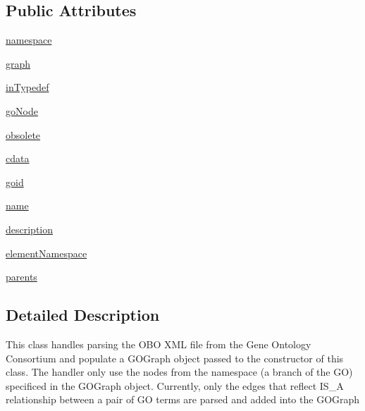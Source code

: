 \subsection*{Public Attributes}
\begin{DoxyCompactItemize}
\item 
\hyperlink{class_g_o_obo_xml_handler_1_1_g_o_obo_xml_handler_aecef11101379b72ea17282b417561bdf}{namespace}
\item 
\hyperlink{class_g_o_obo_xml_handler_1_1_g_o_obo_xml_handler_a44c8fab20dfbfe85307ab3bdc367cc99}{graph}
\item 
\hyperlink{class_g_o_obo_xml_handler_1_1_g_o_obo_xml_handler_a5c0eab36b7e0fb534bdbc22da5166b58}{inTypedef}
\item 
\hyperlink{class_g_o_obo_xml_handler_1_1_g_o_obo_xml_handler_a7c5743967a730bef12ef9ddac6834929}{goNode}
\item 
\hyperlink{class_g_o_obo_xml_handler_1_1_g_o_obo_xml_handler_aba8b9fba07d936ffc046b26fc1e10069}{obsolete}
\item 
\hyperlink{class_g_o_obo_xml_handler_1_1_g_o_obo_xml_handler_ae31e5a7b6388636e2dd341e0acc641c6}{cdata}
\item 
\hyperlink{class_g_o_obo_xml_handler_1_1_g_o_obo_xml_handler_ae3b360ff34e08ef35aee28e88bce8d88}{goid}
\item 
\hyperlink{class_g_o_obo_xml_handler_1_1_g_o_obo_xml_handler_a7fc8050192b7fd5dd66ec525b9cbe962}{name}
\item 
\hyperlink{class_g_o_obo_xml_handler_1_1_g_o_obo_xml_handler_adc00f0e38b911fd0116d5f0c4d236ad8}{description}
\item 
\hyperlink{class_g_o_obo_xml_handler_1_1_g_o_obo_xml_handler_a4efe9f1f6aed395111f5f570b34d3c95}{elementNamespace}
\item 
\hyperlink{class_g_o_obo_xml_handler_1_1_g_o_obo_xml_handler_aaa83347fe8143d86681f6ca65a7f8db2}{parents}
\end{DoxyCompactItemize}


\subsection{Detailed Description}
\begin{DoxyVerb}This class handles parsing the OBO XML file from the Gene Ontology Consortium and populate
    a GOGraph object passed to the constructor of this class.  The handler only use the nodes from
    the namespace (a branch of the GO) specificed in the GOGraph object.  Currently, only the edges
    that reflect IS_A relationship between a pair of GO terms are parsed and added into the GOGraph
\end{DoxyVerb}
 

